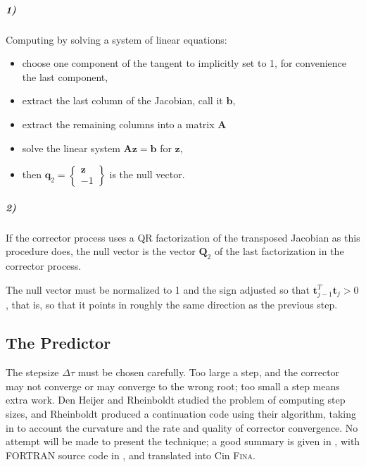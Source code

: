 \documentclass[10pt,openany,twoside]{book}
\numberwithin{equation}{section}   %
\def\Cpp{{C\nolinebreak[4]\hspace{-.05em}\raisebox{.4ex}{\tiny\bf ++}}\:}
\newcommand{\Fina}{{\normalfont\scshape Fina\:}}
\newcommand{\Matrix}[1]{\boldsymbol{#1}}
\newcommand{\Vector}[1]{\boldsymbol{#1}}
\newcommand{\Step}{\Delta\tau} %
\begin{document}
\subparagraph{1)} Computing by solving a system of linear equations:
\begin{itemize}
	\item choose one component of the tangent to implicitly set to 1, 
		for convenience the last component,
	\item extract the last column of the Jacobian, call it $\Vector{b}$,
	\item extract the remaining columns into a matrix $\Matrix{A}$
	\item solve the linear system $\Matrix{A}\Vector{z} = \Vector{b}$ for
		$\Vector{z}$,
	\item then $\Vector{q}_2 =
		\left\{ \begin{array}{c}
			\Vector{z} \\
			-1
		\end{array} \right\}$ is the null vector.
\end{itemize}

\subparagraph{2)} If the corrector process uses a QR factorization
of the transposed Jacobian as this procedure does, the null  
vector is the vector $\Vector{Q}_2$ of the last factorization in the
corrector process.

The null vector must be normalized to 1 and the sign adjusted so that
$\Vector{t}_{j-1}^T \Vector{t}_j > 0$, that is, so that it points in roughly the
same direction as the previous step.

\subsection{The Predictor}
The stepsize $\Step$ must be chosen carefully. Too large a step,
and the corrector may not converge or may converge to the wrong root;
too small a step means extra work. Den Heijer and Rheinboldt
\cite{denheijer1981steplength} studied the problem of computing
step sizes, and Rheinboldt \cite{rheinboldt1983locally}
produced a continuation code using their algorithm, taking in to account
the curvature and the rate and quality of corrector convergence.
No attempt will be made to present the technique; a good summary is given
in \cite{rheinboldt1986numerical}, with FORTRAN source code in \cite{pcon61},
and translated into \Cpp in \Fina.
\end{document}
